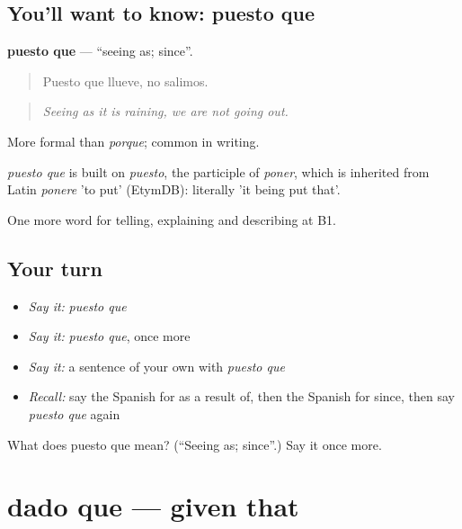 \subsection*{You'll want to know: puesto que}
\textbf{puesto que} — \textquotedblleft{}seeing as; since\textquotedblright{}.

\begin{quote}
Puesto que llueve, no salimos.
\end{quote}

\begin{quote}
\emph{Seeing as it is raining, we are not going out.}
\end{quote}

More formal than \emph{porque}; common in writing.

\begin{cousinweb}
\emph{puesto que} is built on \emph{puesto}, the participle of \emph{poner}, which is inherited from Latin \emph{ponere} 'to put' (EtymDB): literally 'it being put that'.
\end{cousinweb}

\begin{grammarlens}[title={What you've built}]
One more word for telling, explaining and describing at B1.
\end{grammarlens}

\subsection*{Your turn}
\begin{itemize}
\raggedright
  \item \emph{Say it:} \emph{puesto que}
  \item \emph{Say it:} \emph{puesto que}, once more
  \item \emph{Say it:} a sentence of your own with \emph{puesto que}
  \item \emph{Recall:} say the Spanish for as a result of, then the Spanish for since, then say \emph{puesto que} again
\end{itemize}

\begin{tcolorbox}[breakable,colback=teal!4,colframe=teal!35!black,title={Before you move on}]
What does puesto que mean? (\textquotedblleft{}Seeing as; since\textquotedblright{}.) Say it once more.
\end{tcolorbox}
\section[dado que]{dado que — given that}

